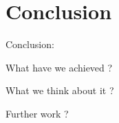 \chapter{Conclusion}\label{ch:conclusion}

Conclusion:

What have we achieved ?

What we think about it ?

Further work ?
